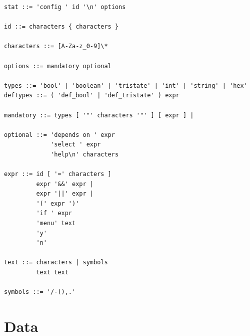 \documentclass[a4paper,11pt]{report}
\begin{document}
\begin{verbatim}
stat ::= 'config ' id '\n' options

id ::= characters { characters }

characters ::= [A-Za-z_0-9]\*

options ::= mandatory optional

types ::= 'bool' | 'boolean' | 'tristate' | 'int' | 'string' | 'hex'
deftypes ::= ( 'def_bool' | 'def_tristate' ) expr

mandatory ::= types [ '"' characters '"' ] [ expr ] |

optional ::= 'depends on ' expr
             'select ' expr
             'help\n' characters

expr ::= id [ '=' characters ] 
         expr '&&' expr |
         expr '||' expr |
         '(' expr ')'
         'if ' expr
         'menu' text
         'y'
         'n'

text ::= characters | symbols 
         text text

symbols ::= '/-(),.'

\end{verbatim}


            \section{Data}
\end{document}
